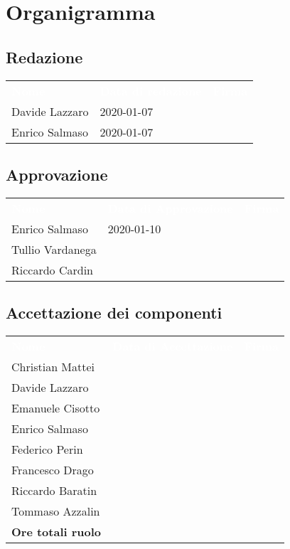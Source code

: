\section{Organigramma}
\subsection{Redazione}
{
	\renewcommand{\arraystretch}{2}
	\centering
	\begin{longtable}{ C{5cm} C{4cm} C{5cm} }
		\textcolor{white}{\textbf{Nome}} & \textcolor{white}{\textbf{Data di redazione}} & \textcolor{white}{\textbf{Firma}}\\	
        
        Davide Lazzaro & 2020-01-07 &   \\
        Enrico Salmaso & 2020-01-07 &   \\
        		
	\end{longtable}
}

\subsection{Approvazione}
{
	\renewcommand{\arraystretch}{2}
	\centering
	\begin{longtable}{ C{5cm} C{4cm} C{5cm} }
		\textcolor{white}{\textbf{Nome}} & \textcolor{white}{\textbf{Data di Approvazione}} & \textcolor{white}{\textbf{Firma}}\\	
		
		
		Enrico Salmaso & 2020-01-10 &  \\
		Tullio Vardanega &  & \\
		Riccardo Cardin & &  \\
		
	\end{longtable}
}

\subsection{Accettazione dei componenti}
{
	\renewcommand{\arraystretch}{2}
	\centering
	\begin{longtable}{ C{5cm} C{4cm} C{5cm} }
		\textcolor{white}{\textbf{Nome}} & \textcolor{white}{\textbf{Data di Accettazione}} & \textcolor{white}{\textbf{Firma}}\\	
		
		
		Christian Mattei & & \\
		Davide Lazzaro & & \\
		Emanuele Cisotto & & \\
		Enrico Salmaso & &  \\
		Federico Perin & & \\
		Francesco Drago & &  \\
		Riccardo Baratin & &  \\
		Tommaso Azzalin & &  \\
		\textbf{Ore totali ruolo} & & \\
		
		
	\end{longtable}
}

